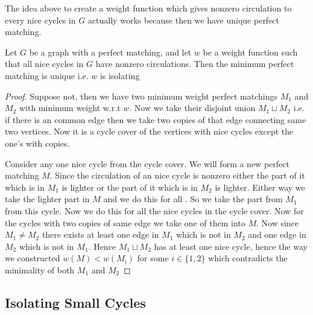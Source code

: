 The idea above to create a weight function which gives nonzero circulation to every nice cycles in $G$ actually works because  then we have unique perfect matching.
\begin{lemma}{\cite[Lemma 3.2]{DattaKulkarniRoy_2009_DIa}}{}
	Let $G$ be a graph with a perfect matching, and let $w$ be a weight function such that all nice cycles in $G$ have nonzero circulations. Then the minimum perfect matching is unique i.e. $w$ is isolating
\end{lemma}
\begin{proof}
	Suppose  not, then we have two minimum weight perfect matchings $M_1$ and $M_2$ with minimum weight w.r.t $w$. Now we take their disjoint union $M_1\sqcup M_2$ i.e. if there is an common edge then we take two copies of that edge connecting same two vertices. Now it is a cycle cover of the vertices with nice cycles except the one's with copies. 
	
	Consider any one nice cycle from the cycle cover. We will form a new perfect matching $M$. Since the circulation of an nice cycle is nonzero either the part of it which is in
	$M_1$ is lighter or the part of it which is in $M_2$ is lighter. Either way we take the lighter part in $M$ and we do this for all . So we take the part from $M_1$ from this cycle. Now we do this for all the nice cycles in the cycle cover. Now for the cycles with two copies of same edge we take one of them into $M$. Now since $M_1\neq M_2$ there exists at least one edge in $M_1$ which is not in $M_2$ and one edge in $M_2$ which is not in $M_1$. Hence $M_1\sqcup M_2$ has at least one nice cycle, hence the way we constructed $w(M)<w(M_i)$ for some $i\in \{1,2\}$ which contradicts the minimality of both $M_1$ and $M_2$
\end{proof}
\subsection{Isolating Small Cycles}

